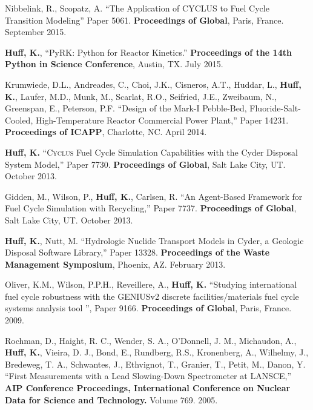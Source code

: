\documentclass[margin,line]{resume}
\newcommand{\Cyclus}{\textsc{Cyclus}\xspace}%
\begin{document}
\begin{resume}
\begin{bibenum}
         Nibbelink, R., Scopatz, A. ``The Application of CYCLUS to Fuel Cycle
         Transition Modeling'' Paper 5061.
         \textbf{Proceedings of Global}, Paris, France. September 2015.
      \item \textbf{Huff, K.}, ``PyRK: Python for Reactor Kinetics.''
         \textbf{Proceedings of the 14th Python in Science Conference}, Austin,
         TX. July 2015.
      \item Krumwiede, D.L., Andreades, C., Choi, J.K., Cisneros, A.T., Huddar, L.,
         \textbf{Huff, K.}, Laufer, M.D., Munk, M., Scarlat, R.O., Seifried, J.E.,
         Zweibaum, N., Greenspan, E., Peterson, P.F.  ``Design of the Mark-I
         Pebble-Bed, Fluoride-Salt-Cooled, High-Temperature Reactor Commercial Power
         Plant,'' Paper 14231.  \textbf{Proceedings of ICAPP}, Charlotte, NC. April 2014.
      \item \textbf{Huff, K.} ``\Cyclus Fuel Cycle Simulation Capabilities with the Cyder Disposal System Model,'' Paper 7730.
         \textbf{Proceedings of Global}, Salt Lake City, UT. October 2013.
      \item Gidden, M., Wilson, P., \textbf{Huff, K.}, Carlsen, R. ``An Agent-Based Framework for Fuel Cycle Simulation with Recycling,'' Paper 7737.
         \textbf{Proceedings of Global}, Salt Lake City, UT. October 2013.
      \item \textbf{Huff, K.}, Nutt, M. ``Hydrologic Nuclide Transport Models in Cyder, a Geologic Disposal Software Library,'' Paper 13328.
         \textbf{Proceedings of the Waste Management Symposium}, Phoenix, AZ.  February 2013.
      \item Oliver, K.M., Wilson, P.P.H., Reveillere, A., \textbf{Huff, K.} ``Studying international fuel cycle robustness with the GENIUSv2 discrete
          facilities/materials fuel cycle systems analysis tool '', Paper 9166.
          \textbf{Proceedings of Global}, Paris, France. 2009.
      \item Rochman, D., Haight, R. C., Wender, S. A., O'Donnell, J. M.,
        Michaudon, A., \textbf{Huff, K.}, Vieira, D. J., Bond, E., Rundberg, R.S.,
        Kronenberg, A., Wilhelmy, J., Bredeweg, T. A., Schwantes, J., Ethvignot, T.,
        Granier, T., Petit, M., Danon, Y.
        ``First Measurements with a Lead Slowing-Down Spectrometer at LANSCE,''
        \textbf{AIP Conference Proceedings, International Conference on Nuclear
        Data for Science and Technology.} Volume 769. 2005.
    \end{bibenum}

\end{resume}
\end{document}
